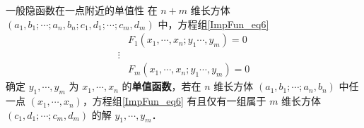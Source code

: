 \begin{definition}{一般隐函数在一点附近的单值性}
在 $n+m$ 维长方体 $(a_1,b_1;\cdots;a_n,b_n;c_1,d_1;\cdots;c_m,d_m)$ 中，方程组\autoref{ImpFun_eq6} 
\begin{equation}
\begin{aligned}
&F_1(x_1,\cdots,x_n;y_1\cdots,y_m)=0\\
\vdots\\
&F_m(x_1,\cdots,x_n;y_1\cdots,y_m)=0
\end{aligned}
\end{equation}
确定 $y_1,\cdots,y_m$ 为 $x_1,\cdots,x_n$ 的\textbf{单值函数}，若在 $n$ 维长方体 $(a_1,b_1;\cdots;a_n,b_n)$ 中任一点 $(x_1,\cdots,x_n)$，方程组\autoref{ImpFun_eq6} 有且仅有一组属于 $m$ 维长方体 $(c_1,d_1;\cdots;c_m,d_m)$ 的解 $y_1,\cdots,y_m$．
\end{definition}